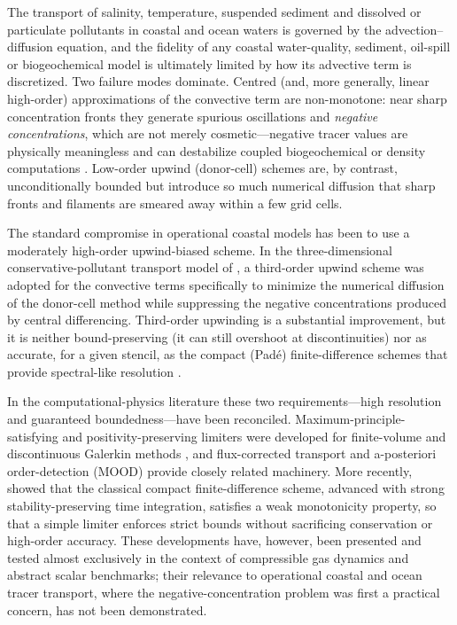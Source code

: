 \documentclass[Journal]{ascelike}   %
\begin{document}
The transport of salinity, temperature, suspended sediment and dissolved or
particulate pollutants in coastal and ocean waters is governed by the
advection--diffusion equation, and the fidelity of any coastal water-quality,
sediment, oil-spill or biogeochemical model is ultimately limited by how its
advective term is discretized. Two failure modes dominate. Centred (and, more
generally, linear high-order) approximations of the convective term are
non-monotone: near sharp concentration fronts they generate spurious oscillations
and \emph{negative concentrations}, which are not merely cosmetic---negative
tracer values are physically meaningless and can destabilize coupled
biogeochemical or density computations \citep{sankaranarayanan1998}. Low-order
upwind (donor-cell) schemes are, by contrast, unconditionally bounded but
introduce so much numerical diffusion that sharp fronts and filaments are smeared
away within a few grid cells.

The standard compromise in operational coastal models has been to use a
moderately high-order upwind-biased scheme. In the three-dimensional
conservative-pollutant transport model of \citet{sankaranarayanan1998}, a
third-order upwind scheme \citep{kowalik1993} was adopted for the convective
terms specifically to minimize the numerical diffusion of the donor-cell method
while suppressing the negative concentrations produced by central differencing.
Third-order upwinding is a substantial improvement, but it is neither
bound-preserving (it can still overshoot at discontinuities) nor as accurate, for
a given stencil, as the compact (Pad\'e) finite-difference schemes that provide
spectral-like resolution \citep{lele1992}.

In the computational-physics literature these two requirements---high resolution
and guaranteed boundedness---have been reconciled. Maximum-principle-satisfying and
positivity-preserving limiters were developed for finite-volume and discontinuous
Galerkin methods \citep{zhangshu2010,zhangshu2011}, and flux-corrected transport
\citep{zalesak1979} and a-posteriori order-detection (MOOD) \citep{clain2011mood}
provide closely related machinery. More recently, \citet{lixiezhang2018} showed
that the classical compact finite-difference scheme, advanced with strong
stability-preserving time integration, satisfies a weak monotonicity property, so
that a simple limiter enforces strict bounds without sacrificing conservation or
high-order accuracy. These developments have, however, been presented and tested
almost exclusively in the context of compressible gas dynamics and abstract scalar
benchmarks; their relevance to operational coastal and ocean tracer transport,
where the negative-concentration problem was first a practical concern, has not
been demonstrated.
\end{document}
